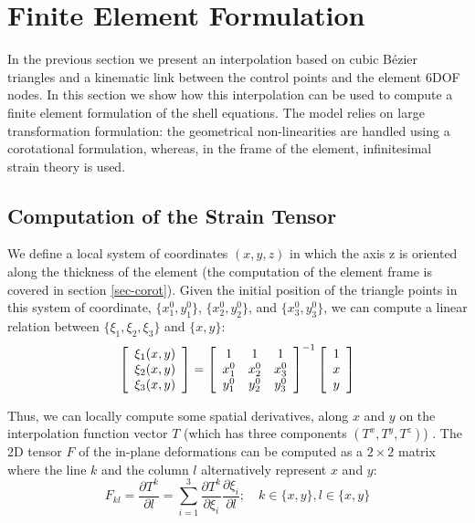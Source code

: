 \documentclass{egpubl}
\newcommand{\deriv}[2]{\frac{\partial #1}{\partial #2}}
\begin{document}




\section{Finite Element Formulation} %

In the previous section we present an interpolation based on cubic B\'ezier triangles and a kinematic link between the control points and the element 6DOF nodes.
In this section we show how this interpolation can be used to compute a finite element formulation of the shell equations.
The model relies on large transformation formulation: the geometrical non-linearities are handled using a corotational formulation, whereas, in the frame of the element, infinitesimal strain theory is used.


\subsection{Computation of the Strain Tensor} %

We define a local system of coordinates $(x,y,z)$ in which the axis z is oriented along the thickness of the element (the computation of the element frame is covered in section \ref{sec-corot}). 
Given the initial position of the triangle points in this system of coordinate, $\{x_1^0, y_1^0\}$,  $\{x_2^0, y_2^0\}$, and  $\{x_3^0, y_3^0\}$, we can compute a linear relation between $\{\xi_1,\xi_2, \xi_3\}$ and $\{ x,y \}$:
%
\begin{equation}
\label{shape-vector}
\left[ \begin{array}[c]{c} \xi_1(x,y) \\ \xi_2(x,y) \\ \xi_3(x,y) \end{array} \right] =
\left[ \begin{array}[c]{ccc}
1 & 1 &  1 \\
x_1^0 & x_2^0 & x_3^0 \\
y_1^0 & y_2^0 & y_3^0
\end{array} \right] ^{-1} 
\left[ \begin{array}[c]{c} 1 \\ x \\ y \end{array} \right] 
\end{equation}

Thus, we can locally compute some spatial derivatives, along $x$ and $y$ on the interpolation function vector $T$ (which has three components $(T^x, T^y, T^z)$) .
The 2D tensor $F$ of the in-plane deformations can be computed as a $2\times2$ matrix where the line $k$ and the column $l$ alternatively represent $x$ and $y$:
%
\begin{equation}
    F_{kl} = \deriv{T^k}{l}  = 
    \sum_{i=1}^3 \deriv{T^k}{\xi_i} \deriv{\xi_i}{l};
    \quad k \in \{x,y\}, l \in \{x,y\}
\end{equation}
\end{document}
